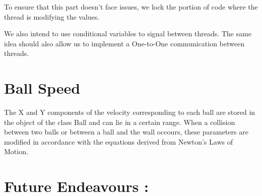 \documentclass[]{article}
\begin{document}
To ensure that this part doesn't face issues, we lock the portion of code where the thread is modifying the values.

We also intend to use conditional variables to signal between threads. The same idea should also allow us to implement a One-to-One communication between threads.

\begin{flushleft}


\end{flushleft}

\section{Ball Speed}

\begin{flushleft}

The X and Y components of the velocity corresponding to each ball are stored in the  object of the class Ball and can lie in a certain range. When a collision between two balls or between a ball and the wall occours, these parameters are modified in accordance with the equations derived from Newton's Laws of Motion.  

\end{flushleft}


\section{Future Endeavours :}
\end{document}
